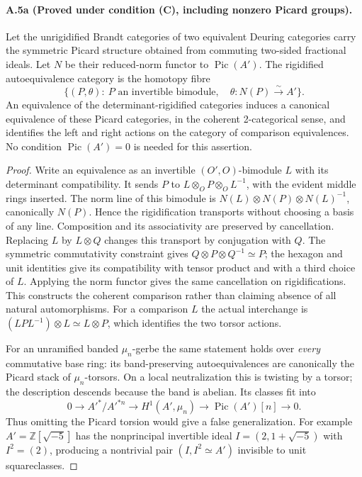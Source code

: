 \paragraph{A.5a (Proved under condition (C), including nonzero Picard groups).}
Let the unrigidified Brandt categories of two equivalent Deuring
categories carry the symmetric Picard structure obtained from
commuting two-sided fractional ideals. Let $N$ be their reduced-norm
functor to $\operatorname{Pic}(A')$. The rigidified autoequivalence
category is the homotopy fibre
\[
 \{(P,\theta):\ P\text{ an invertible bimodule},\quad
          \theta:N(P)\xrightarrow{\sim}A'\}.
\]
An equivalence of the determinant-rigidified categories induces a
canonical equivalence of these Picard categories, in the coherent
2-categorical sense, and identifies the left and right actions on
the category of comparison equivalences. No condition
$\operatorname{Pic}(A')=0$ is needed for this assertion.

\begin{proof}
Write an equivalence as an invertible $(O',O)$-bimodule $L$ with its
determinant compatibility. It sends $P$ to
$L\otimes_OP\otimes_OL^{-1}$, with the evident middle rings inserted.
The norm line of this bimodule is
$N(L)\otimes N(P)\otimes N(L)^{-1}$, canonically $N(P)$.
Hence the rigidification transports without choosing a basis of any
line. Composition and its associativity are preserved by cancellation.
Replacing $L$ by $L\otimes Q$ changes this transport by conjugation
with $Q$. The symmetric commutativity constraint gives
$Q\otimes P\otimes Q^{-1}\simeq P$; the hexagon and unit identities
give its compatibility with tensor product and with a third choice
of $L$. Applying the norm functor gives the same cancellation on
rigidifications. This constructs the coherent comparison rather
than claiming absence of all natural automorphisms.
For a comparison $L$ the actual interchange is
$(LPL^{-1})\otimes L\simeq L\otimes P$, which identifies the two
torsor actions.

For an unramified banded $\mu_n$-gerbe the same statement holds over
\emph{every} commutative base ring: its band-preserving
autoequivalences are canonically the Picard stack of $\mu_n$-torsors.
On a local neutralization this is twisting by a torsor; the description
descends because the band is abelian. Its classes fit into
\[
0\longrightarrow A'^*/A'^{*n}\longrightarrow H^1(A',\mu_n)
\longrightarrow\operatorname{Pic}(A')[n]\longrightarrow0.
\]
Thus omitting the Picard torsion would give a false generalization.
For example $A'=\mathbb Z[\sqrt{-5}]$ has the nonprincipal invertible
ideal $I=(2,1+\sqrt{-5})$ with $I^2=(2)$, producing a nontrivial
pair $(I,I^2\simeq A')$ invisible to unit squareclasses.
\end{proof}


